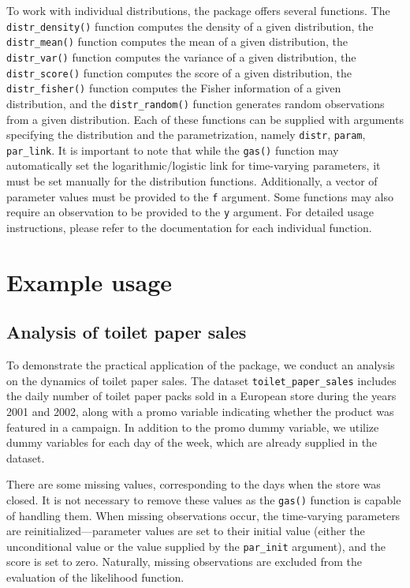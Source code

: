 To work with individual distributions, the  package offers several functions. The \texttt{distr\_density()} function computes the density of a given distribution, the \texttt{distr\_mean()} function computes the mean of a given distribution, the \texttt{distr\_var()} function computes the variance of a given distribution, the \texttt{distr\_score()} function computes the score of a given distribution, the \texttt{distr\_fisher()} function computes the Fisher information of a given distribution, and the \texttt{distr\_random()} function generates random observations from a given distribution. Each of these functions can be supplied with arguments specifying the distribution and the parametrization, namely \texttt{distr}, \texttt{param}, \texttt{par\_link}. It is important to note that while the \texttt{gas()} function may automatically set the logarithmic/logistic link for time-varying parameters, it must be set manually for the distribution functions. Additionally, a vector of parameter values must be provided to the \texttt{f} argument. Some functions may also require an observation to be provided to the \texttt{y} argument. For detailed usage instructions, please refer to the documentation for each individual function.

\section{Example usage}\label{example-usage}

\subsection{Analysis of toilet paper sales}\label{analysis-of-toilet-paper-sales}

To demonstrate the practical application of the package, we conduct an analysis on the dynamics of toilet paper sales. The dataset \texttt{toilet\_paper\_sales} includes the daily number of toilet paper packs sold in a European store during the years 2001 and 2002, along with a promo variable indicating whether the product was featured in a campaign. In addition to the promo dummy variable, we utilize dummy variables for each day of the week, which are already supplied in the dataset.

There are some missing values, corresponding to the days when the store was closed. It is not necessary to remove these values as the \texttt{gas()} function is capable of handling them. When missing observations occur, the time-varying parameters are reinitialized---parameter values are set to their initial value (either the unconditional value or the value supplied by the \texttt{par\_init} argument), and the score is set to zero. Naturally, missing observations are excluded from the evaluation of the likelihood function.

